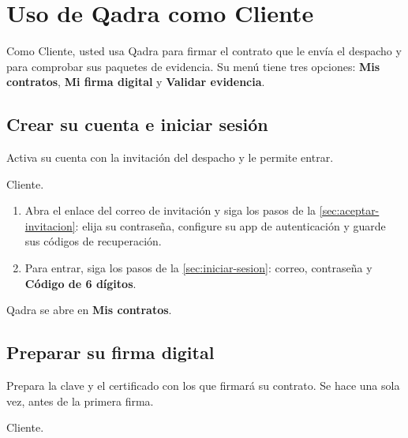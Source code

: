 \chapter{Uso de Qadra como Cliente}\label{cap:cliente}

Como Cliente, usted usa Qadra para firmar el contrato que le envía el
despacho y para comprobar sus paquetes de evidencia. Su menú tiene tres
opciones: \textbf{Mis contratos}, \textbf{Mi firma digital} y
\textbf{Validar evidencia}.


\section{Crear su cuenta e iniciar sesión}\label{sec:cliente-acceso}

\paraque Activa su cuenta con la invitación del despacho y le permite
entrar.

\disponible Cliente.

\pasos
\begin{enumerate}
  \item Abra el enlace del correo de invitación y siga los pasos de la
        \cref{sec:aceptar-invitacion}: elija su contraseña, configure su app
        de autenticación y guarde sus códigos de recuperación.
  \item Para entrar, siga los pasos de la \cref{sec:iniciar-sesion}: correo,
        contraseña y \textbf{Código de 6 dígitos}.
\end{enumerate}

\resultado Qadra se abre en \textbf{Mis contratos}.


\section{Preparar su firma digital}\label{sec:cliente-firma}

\paraque Prepara la clave y el certificado con los que firmará su contrato.
Se hace una sola vez, antes de la primera firma.

\disponible Cliente.

